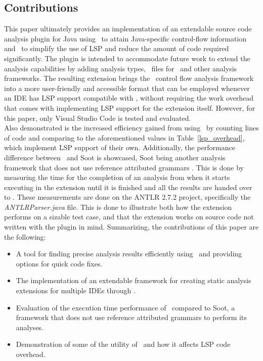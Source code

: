 \documentclass[sigplan,10pt]{acmart}
\begin{document}
\subsection{Contributions}
This paper ultimately provides an implementation of an extendable source code analysis plugin for Java using \intraj\ to attain Java-specific control-flow information and \magpie\ to simplify the use of LSP and reduce the amount of code required significantly. The plugin is intended to accommodate future work to extend the analysis capabilities by adding analysis types, \jastadd\ files for \intraj\ and other analysis frameworks. The resulting extension brings the \intraj\ control flow analysis framework into a more user-friendly and accessible format that can be employed whenever an IDE has LSP support compatible with \magpie, without requiring the work overhead that comes with implementing LSP support for the extension itself. However, for this paper, only Visual Studio Code is tested and evaluated. 
\\
Also demonstrated is the increased efficiency gained from using \magpie\ by counting lines of code and comparing to the aforementioned values in Table~\ref{lsp_overhead}, which implement LSP support of their own. Additionally, the performance difference between \intraj\ and Soot is showcased, Soot being another analysis framework that does not use reference attributed grammars \cite{soot}. This is done by measuring the time for the completion of an analysis from when it starts executing in the extension until it is finished and all the results are handed over to \magpie. These measurements are done on the ANTLR 2.7.2 project, specifically the \textit{ANTLRParser.java} file. This is done to illustrate both how the extension performs on a sizable test case, and that the extension works on source code not written with the plugin in mind.
Summarizing, the contributions of this paper are the following:
\begin{itemize}
    \item A tool for finding precise analysis results efficiently using \intraj\ and providing options for quick code fixes.

    \item The implementation of an extendable framework for creating static analysis extensions for multiple IDEs through \magpie.
    
    \item Evaluation of the execution time performance of \intraj\ compared to Soot, a framework that does not use reference attributed grammars to perform its analyses.
    
    \item Demonstration of some of the utility of \magpie\ and how it affects LSP code overhead.
\end{itemize}
\end{document}
